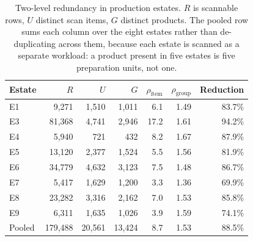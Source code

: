 \begin{table}[htbp]
\centering
\caption{Two-level redundancy in production estates. $R$ is scannable rows, $U$ distinct scan items, $G$ distinct products. The pooled row sums each column over the eight estates rather than de-duplicating across them, because each estate is scanned as a separate workload: a product present in five estates is five preparation units, not one.}
\label{tab:redundancy}
\footnotesize
\begin{tabular}{l r r r r r r}
\hline
Estate & $R$ & $U$ & $G$ & $\rho_{\text{item}}$ & $\rho_{\text{group}}$ & Reduction \\
\hline
E1 & 9,271 & 1,510 & 1,011 & 6.1 & 1.49 & 83.7\% \\
E3 & 81,368 & 4,741 & 2,946 & 17.2 & 1.61 & 94.2\% \\
E4 & 5,940 & 721 & 432 & 8.2 & 1.67 & 87.9\% \\
E5 & 13,120 & 2,377 & 1,524 & 5.5 & 1.56 & 81.9\% \\
E6 & 34,779 & 4,632 & 3,123 & 7.5 & 1.48 & 86.7\% \\
E7 & 5,417 & 1,629 & 1,200 & 3.3 & 1.36 & 69.9\% \\
E8 & 23,282 & 3,316 & 2,162 & 7.0 & 1.53 & 85.8\% \\
E9 & 6,311 & 1,635 & 1,026 & 3.9 & 1.59 & 74.1\% \\
\hline
Pooled & 179,488 & 20,561 & 13,424 & 8.7 & 1.53 & 88.5\% \\
\hline
\end{tabular}
\end{table}
